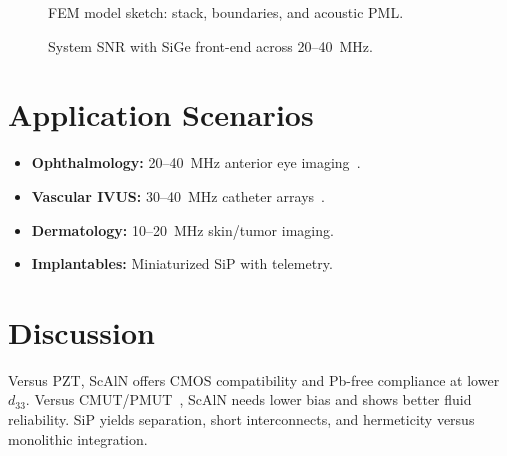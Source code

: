 \documentclass[conference]{IEEEtran}
\begin{document}
\begin{figure}[!t]
\centering
{}
\caption{FEM model sketch: stack, boundaries, and acoustic PML.}
\label{fig:mode}
\end{figure}

\begin{figure}[!t]
\centering
{}
\caption{System SNR with SiGe front-end across 20--40~MHz.}
\label{fig:snr}
\end{figure}

\section{Application Scenarios}
\begin{itemize}
  \item \textbf{Ophthalmology:} 20--40~MHz anterior eye imaging~\cite{pavlin2009ubm}.
  \item \textbf{Vascular IVUS:} 30--40~MHz catheter arrays~\cite{foster2000ivus}.
  \item \textbf{Dermatology:} 10--20~MHz skin/tumor imaging.
  \item \textbf{Implantables:} Miniaturized SiP with telemetry.
\end{itemize}

\section{Discussion}
Versus PZT, ScAlN offers CMOS compatibility and Pb-free compliance at lower $d_{33}$. Versus CMUT/PMUT~\cite{khuri2009cmut}, ScAlN needs lower bias and shows better fluid reliability. SiP yields separation, short interconnects, and hermeticity versus monolithic integration.
\end{document}
